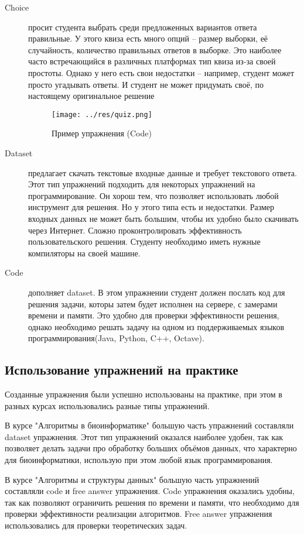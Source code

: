 \documentclass{matmex-diploma-custom}
\begin{document}
\begin{description}
\item[Choice] просит студента выбрать среди предложенных вариантов
  ответа правильные. У этого квиза есть много опций -- размер выборки,
  её случайность, количество правильных ответов в выборке. Это
  наиболее часто встречающийся в различных платформах тип квиза из-за
  своей простоты. Однако у него есть свои недостатки -- например,
  студент может просто угадывать ответы. И студент не может придумать
  своё, по настоящему оригинальное решение
  \begin{figure}
    \texttt{[image: ../res/quiz.png]}
    \caption{Пример упражнения (Code)}
  \end{figure}

\item[Dataset] предлагает скачать текстовые входные данные и требует
  текстового ответа. Этот тип упражнений подходить для некоторых
  упражнений на программирование. Он хорош тем, что позволяет
  использовать любой инструмент для решения. Но у этого типа есть и
  недостатки. Размер входных данных не может быть большим, чтобы их
  удобно было скачивать через Интернет. Сложно проконтролировать
  эффективность пользовательского решения. Студенту необходимо иметь
  нужные компиляторы на своей машине.

\item[Code] дополняет dataset. В этом упражнении студент должен
  послать код для решения задачи, которы затем будет исполнен на
  сервере, с замерами времени и памяти. Это удобно для проверки
  эффективности решения, однако необходимо решать задачу на одном из
  поддерживаемых языков программирования(Java, Python, C++, Octave).
\end{description}

\subsection{Использование упражнений на практике}

Созданные упражнения были успешно использованы на практике, при этом в
разных курсах использовались разные типы упражнений.

В курсе "Алгоритмы в биоинформатике" большую часть упражнений
составляли dataset упражнения. Этот тип упражнений оказался наиболее
удобен, так как позволяет делать задачи про обработку больших объёмов
данных, что характерно для биоинформатики, использую при этом любой
язык программирования.

В курсе "Алгоритмы и структуры данных" большую часть упражнений
составляли code и free answer упражнения. Code упражнения оказались
удобны, так как позволяют ограничить решения по времени и памяти, что
необходимо для проверки эффективности реализации алгоритмов. Free
answer упражнения использовались для проверки теоретических задач.
\end{document}
